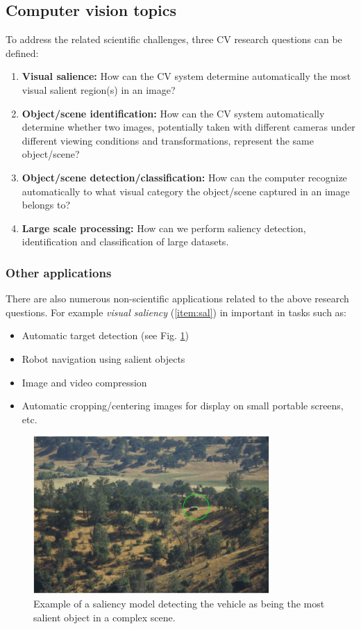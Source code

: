 \subsection{Computer vision topics} 
To address the related scientific challenges, three  CV research questions can be defined:
\begin{enumerate}
\item {\bf Visual salience:} How can the CV system determine automatically the most visual salient region(s) in an image?\label{item:sal}
\item {\bf Object/scene identification:} How can the CV system automatically determine whether two images, potentially taken with different cameras under different viewing conditions and transformations, represent the same object/scene?\label{item:ident}
\item {\bf Object/scene detection/classification:} How can the computer recognize automatically to what visual category the object/scene captured in an image belongs to? \label{item:und}
\item{\bf Large scale processing:} How can we perform saliency detection, identification and classification of large datasets.
\end{enumerate}

\subsubsection{Other applications}
There are also numerous non-scientific applications related to the above research questions.  For example {\em visual saliency} (\ref{item:sal}) in important in tasks such as:
\begin{itemize}
\item Automatic target detection (see Fig. \ref{fig:sal})
\item Robot navigation using salient objects
\item Image and video compression
\item Automatic cropping/centering images for display on small portable screens, etc.
\end{itemize}

\begin{figure}[H]
\begin{center}
\includegraphics[width=0.8\textwidth]{fig/saliency}
\end{center}
\caption{Example of a saliency model detecting the vehicle as being the most salient object in a complex scene.}
\label{fig:sal}
\end{figure}

